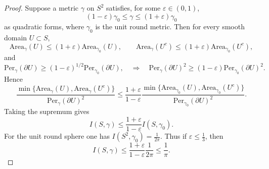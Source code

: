 \documentclass{amsart}
\begin{document}
{\begin{proof}
\medskip
\noindent
Suppose a metric $\gamma$ on $S^2$ satisfies, for some $\varepsilon\in(0,1)$,
\begin{equation}\label{eq:bilip-proof}
(1-\varepsilon)\gamma_{0}\le \gamma \le (1+\varepsilon)\gamma_{0}
\end{equation}
as quadratic forms, where $\gamma_{0}$ is the unit round metric. Then for every smooth domain $U\subset S$,
\[
\text{Area}_{\gamma}(U)\le (1+\varepsilon)\text{Area}_{\gamma_{0}}(U), 
\qquad
\text{Area}_{\gamma}(U^{c})\le (1+\varepsilon)\text{Area}_{\gamma_{0}}(U^{c}),
\]
and
\[
\text{Per}_{\gamma}(\partial U)\ge (1-\varepsilon)^{1/2}\text{Per}_{\gamma_{0}}(\partial U),
\quad\Rightarrow\quad
\text{Per}_{\gamma}(\partial U)^2\ge (1-\varepsilon)\text{Per}_{\gamma_{0}}(\partial U)^2.
\]
Hence
\[
\frac{\min\{\text{Area}_{\gamma}(U),\text{Area}_{\gamma}(U^{c})\}}{\text{Per}_{\gamma}(\partial U)^2}
\le
\frac{1+\varepsilon}{1-\varepsilon}
\frac{\min\{\text{Area}_{\gamma_{0}}(U),\text{Area}_{\gamma_{0}}(U^{c})\}}{\text{Per}_{\gamma_{0}}(\partial U)^2}.
\]
Taking the supremum gives
\begin{equation}\label{eq:I-bilip-proof}
I(S,\gamma)\le \frac{1+\varepsilon}{1-\varepsilon} I(S,\gamma_{0}).
\end{equation}
For the unit round sphere one has $I(S^{2},\gamma_{0})=\frac{1}{2\pi}$. Thus if $\varepsilon\le \frac13$, then
\begin{equation}\label{eq:I-target-proof}
I(S,\gamma)\le \frac{1+\varepsilon}{1-\varepsilon}\frac{1}{2\pi}\le \frac{1}{\pi}.
\end{equation}


\end{proof}}
\end{document}

